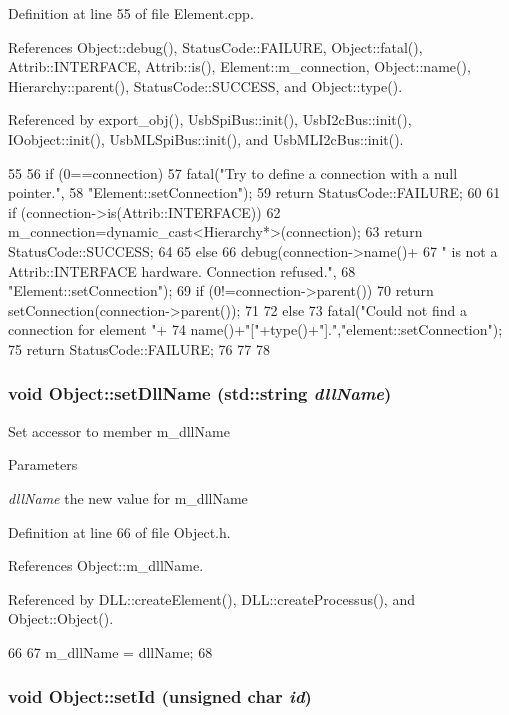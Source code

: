 Definition at line 55 of file Element.cpp.

References Object::debug(), StatusCode::FAILURE, Object::fatal(), Attrib::INTERFACE, Attrib::is(), Element::m\_\-connection, Object::name(), Hierarchy::parent(), StatusCode::SUCCESS, and Object::type().

Referenced by export\_\-obj(), UsbSpiBus::init(), UsbI2cBus::init(), IOobject::init(), UsbMLSpiBus::init(), and UsbMLI2cBus::init().


\begin{DoxyCode}
55                                                       {
56   if (0==connection){
57     fatal("Try to define a connection with a null pointer.",
58         "Element::setConnection");
59     return StatusCode::FAILURE;
60   }
61   if (connection->is(Attrib::INTERFACE)){
62     m_connection=dynamic_cast<Hierarchy*>(connection);
63     return StatusCode::SUCCESS;
64   }
65   else {
66     debug(connection->name()+
67         " is not a Attrib::INTERFACE hardware. Connection refused.",
68         "Element::setConnection");
69     if (0!=connection->parent()){
70       return setConnection(connection->parent());
71     }
72     else{
73       fatal("Could not find a connection for element "+
74           name()+"["+type()+"].","element::setConnection");
75       return StatusCode::FAILURE;
76     }
77   }
78 }
\end{DoxyCode}
\hypertarget{classObject_a870c5af919958c2136623b2d7816d123}{
\subsubsection[{setDllName}]{\setlength{\rightskip}{0pt plus 5cm}void Object::setDllName (std::string {\em dllName})}}
\label{classObject_a870c5af919958c2136623b2d7816d123}
Set accessor to member m\_\-dllName 
\begin{DoxyParams}{Parameters}
\item[{\em dllName}]the new value for m\_\-dllName \end{DoxyParams}


Definition at line 66 of file Object.h.

References Object::m\_\-dllName.

Referenced by DLL::createElement(), DLL::createProcessus(), and Object::Object().


\begin{DoxyCode}
66                                       {
67     m_dllName = dllName;
68   }
\end{DoxyCode}
\hypertarget{classObject_a398fe08cba594a0ce6891d59fe4f159f}{
\subsubsection[{setId}]{\setlength{\rightskip}{0pt plus 5cm}void Object::setId (unsigned char {\em id})}}
\label{classObject_a398fe08cba594a0ce6891d59fe4f159f}


